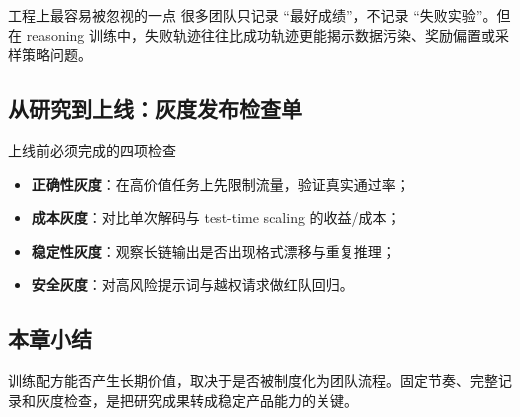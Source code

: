 \begin{knowledgebox}{工程上最容易被忽视的一点}
很多团队只记录 ``最好成绩''，不记录 ``失败实验''。但在 reasoning 训练中，失败轨迹往往比成功轨迹更能揭示数据污染、奖励偏置或采样策略问题。
\end{knowledgebox}

\subsection{从研究到上线：灰度发布检查单}
\begin{warningbox}{上线前必须完成的四项检查}
\begin{itemize}
    \item \textbf{正确性灰度}：在高价值任务上先限制流量，验证真实通过率；
    \item \textbf{成本灰度}：对比单次解码与 test-time scaling 的收益/成本；
    \item \textbf{稳定性灰度}：观察长链输出是否出现格式漂移与重复推理；
    \item \textbf{安全灰度}：对高风险提示词与越权请求做红队回归。
\end{itemize}
\end{warningbox}

\subsection{本章小结}
训练配方能否产生长期价值，取决于是否被制度化为团队流程。固定节奏、完整记录和灰度检查，是把研究成果转成稳定产品能力的关键。


